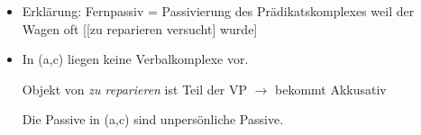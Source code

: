 
\begin{itemize}

\item Erklärung: Fernpassiv = Passivierung des Prädikatskomplexes
\ea
weil    der Wagen     oft   [[zu reparieren versucht] wurde]
%
\z


\item In (a,c) liegen keine Verbalkomplexe vor. 
\eal
{}
\zl

Objekt von \emph{zu reparieren} ist Teil der VP $\to$ bekommt Akkusativ


Die Passive in (a,c) sind unpersönliche Passive.

\end{itemize}



